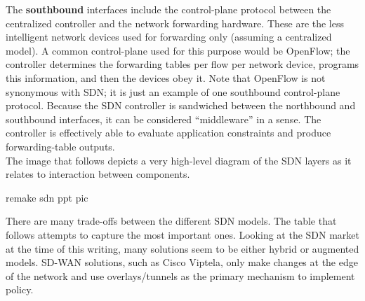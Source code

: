 The \textbf{southbound} interfaces include the control-plane protocol between the
centralized controller and the network forwarding hardware. These are the less
intelligent network devices used for forwarding only (assuming a centralized
model). A common control-plane used for this purpose would be OpenFlow; the
controller determines the forwarding tables per flow per network device,
programs this information, and then the devices obey it. Note that OpenFlow is
not synonymous with SDN\@; it is just an example of one southbound control-plane
protocol. Because the SDN controller is sandwiched between the northbound and
southbound interfaces, it can be considered ``middleware'' in a sense. The
controller is effectively able to evaluate application constraints and produce
forwarding-table outputs. \\

The image that follows depicts a very high-level diagram of the SDN layers as
it relates to interaction between components.

remake sdn ppt pic

There are many trade-offs between the different SDN models. The table that follows
attempts to capture the most important ones. Looking at the SDN market at the
time of this writing, many solutions seem to be either hybrid or augmented
models. SD-WAN solutions, such as Cisco Viptela, only make changes at the edge
of the network and use overlays/tunnels as the primary mechanism to implement policy.

